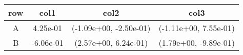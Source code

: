 \begin{tabular}{cccc}
\toprule
row&col1&col2&col3\tabularnewline
\midrule
A&4.25e-01& (-1.09e+00, -2.50e-01)& (-1.11e+00, 7.55e-01)\tabularnewline
B&-6.06e-01& (2.57e+00, 6.24e-01)& (1.79e+00, -9.89e-01)\tabularnewline
\bottomrule
\end{tabular}
